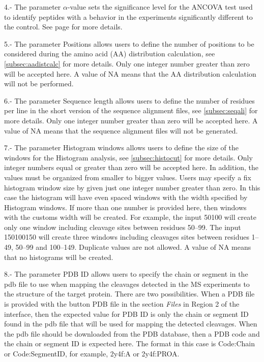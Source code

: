 \num{4}.- The parameter $\alpha$-value sets the significance level for the ANCOVA test used to identify peptides with a behavior in the experiments significantly different to the control. See page \pageref{par:ancovatest} for more details.

\num{5}.- The parameter Positions\label{par:enzdigPos} allows users to define the number of positions to be considered during the amino acid (AA) distribution calculation, see \autoref{subsec:aadistcalc} for more details. Only one integer number greater than zero will be accepted here. A value of NA means that the AA distribution calculation will not be performed. 

\num{6}.- The parameter Sequence length\label{par:enzdigSeqL} allows users to define the number of residues per line in the short version of the sequence alignment files, see \autoref{subsec:seqali} for more details. Only one integer number greater than zero will be accepted here. A value of NA means that the sequence alignment files will not be generated.

\num{7}.- The parameter Histogram windows\label{par:enzdigHist} allows users to define the size of the windows for the Histogram analysis, see \autoref{subsec:histocut} for more details. Only integer numbers equal or greater than zero will be accepted here. In addition, the values must be organized from smaller to bigger values. Users may specify a fix histogram window size by given just one integer number greater than zero. In this case the histogram will have even spaced windows with the width specified by Histogram windows. If more than one number is provided here, then windows with the customs width will be created. For example, the input \numlist{50 100} will create only one window including cleavage sites between residues \numrange{50}{99}. The input \numlist{1 50 100 150} will create three windows including cleavages sites between residues \numrange{1}{49}, \numrange{50}{99} and \numrange{100}{149}. Duplicate values are not allowed. A value of NA means that no histograms will be created.

\num{8}.- The parameter PDB ID\label{par:pdbID} allows users to specify the chain or segment in the pdb file to use when mapping the cleavages detected in the MS experiments to the structure of the target protein. There are two possibilities. When a PDB file is provided with the button PDB file in the section \textit{Files} in Region \num{2} of the interface, then the expected value for PDB ID is only the chain or segment ID found in the pdb file that will be used for mapping the detected cleavages. When the pdb file should be downloaded from the PDB database, then a PDB code and the chain or segment ID is expected here. The format in this case is Code:Chain or Code:SegmentID, for example, 2y4f:A or 2y4f:PROA. 

